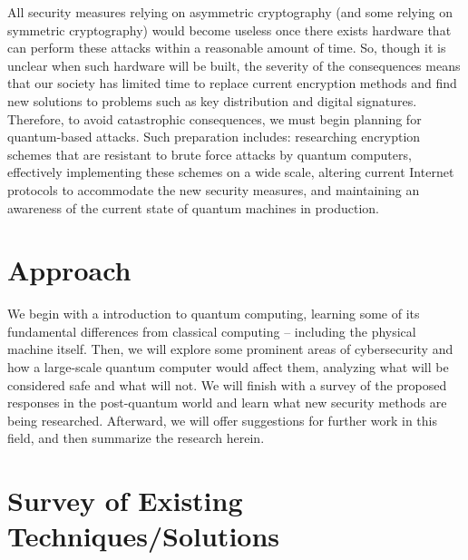 \documentclass[11pt]{article}
\begin{document}
All security measures relying on asymmetric cryptography (and some relying on symmetric cryptography) would become useless once there exists hardware that can perform these attacks within a reasonable amount of time.
So, though it is unclear when such hardware will be built, the severity of the consequences means that our society has limited time to replace current encryption methods and find new solutions to problems such as key distribution and digital signatures.
Therefore, to avoid catastrophic consequences, we must begin planning for quantum-based attacks. Such preparation includes: researching encryption schemes that are resistant to brute force attacks by quantum computers, effectively implementing these schemes on a wide scale, altering current Internet protocols to accommodate the new security measures, and maintaining an awareness of the current state of quantum machines in production.




\section{Approach}

We begin with a introduction to quantum computing, learning some of its fundamental
differences from classical computing -- including the physical machine itself.
Then, we will explore some prominent areas of cybersecurity
and how a large-scale quantum computer would affect them, analyzing what will be considered
safe and what will not.
We will finish with a survey of the proposed responses in the post-quantum world
and learn what new security methods are being researched.
Afterward, we will offer suggestions for further work in this field, and then
summarize the research herein. 




\section{Survey of Existing Techniques/Solutions}
 
\end{document}

